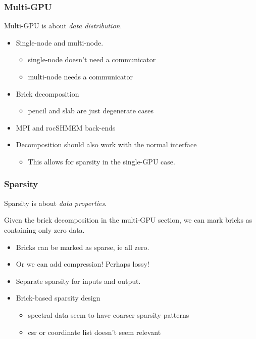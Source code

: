\documentclass[10pt,aspectratio=169]{beamer}
\begin{document}
\begin{frame}
  \frametitle{Multi-GPU}

  \begin{center}
    Multi-GPU is about \emph{data distribution}.
  \end{center}

  \medskip

  \begin{itemize}
  \item Single-node and multi-node.
    \begin{itemize}
    \item single-node doesn't need a communicator
    \item multi-node needs a communicator
    \end{itemize}
  \item Brick decomposition
    \begin{itemize}
    \item pencil and slab are just degenerate cases
    \end{itemize}
  \item MPI and rocSHMEM back-ends
  \item Decomposition should also work with the normal interface
    \begin{itemize}
    \item This allows for sparsity in the single-GPU case.
    \end{itemize}
  \end{itemize}
  
\end{frame}


\begin{frame}
  \frametitle{Sparsity}

  \begin{center}
    Sparsity is about \emph{data properties}.
  \end{center}

  
  Given the brick decomposition in the multi-GPU section, we can mark
  bricks as containing only zero data.

  \medskip

  \begin{itemize}
  \item Bricks can be marked as sparse, ie all zero.
  \item Or we can add compression!  Perhaps lossy!
  \item Separate sparsity for inputs and output.
  \item Brick-based sparsity design
    \begin{itemize}
    \item spectral data seem to have coarser sparsity patterns
    \item csr or coordinate list doesn't seem relevant
    \end{itemize}
  \end{itemize}
      
\end{frame}
\end{document}
